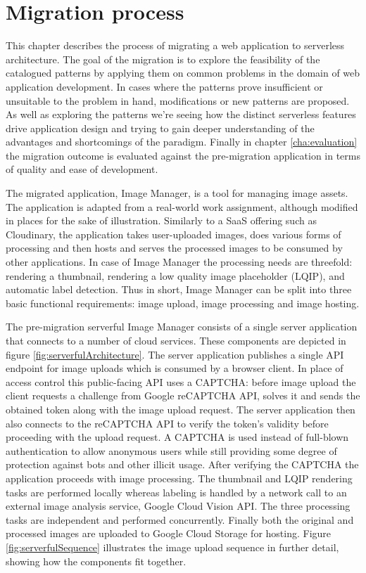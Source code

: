 \chapter{Migration process}

This chapter describes the process of migrating a web application to serverless architecture. The goal of the migration is to explore the feasibility of the catalogued patterns by applying them on common problems in the domain of web application development. In cases where the patterns prove insufficient or unsuitable to the problem in hand, modifications or new patterns are proposed. As well as exploring the patterns we're seeing how the distinct serverless features drive application design and trying to gain deeper understanding of the advantages and shortcomings of the paradigm. Finally in chapter \ref{cha:evaluation} the migration outcome is evaluated against the pre-migration application in terms of quality and ease of development.

The migrated application, Image Manager, is a tool for managing image assets. The application is adapted from a real-world work assignment, although modified in places for the sake of illustration. Similarly to a SaaS offering such as Cloudinary, the application takes user-uploaded images, does various forms of processing and then hosts and serves the processed images to be consumed by other applications. In case of Image Manager the processing needs are threefold: rendering a thumbnail, rendering a low quality image placeholder (LQIP), and automatic label detection. Thus in short, Image Manager can be split into three basic functional requirements: image upload, image processing and image hosting.

The pre-migration serverful Image Manager consists of a single server application that connects to a number of cloud services. These components are depicted in figure \ref{fig:serverfulArchitecture}. The server application publishes a single API endpoint for image uploads which is consumed by a browser client. In place of access control this public-facing API uses a CAPTCHA: before image upload the client requests a challenge from Google reCAPTCHA API, solves it and sends the obtained token along with the image upload request. The server application then also connects to the reCAPTCHA API to verify the token's validity before proceeding with the upload request. A CAPTCHA is used instead of full-blown authentication to allow anonymous users while still providing some degree of protection against bots and other illicit usage. After verifying the CAPTCHA the application proceeds with image processing. The thumbnail and LQIP rendering tasks are performed locally whereas labeling is handled by a network call to an external image analysis service, Google Cloud Vision API. The three processing tasks are independent and performed concurrently. Finally both the original and processed images are uploaded to Google Cloud Storage for hosting. Figure \ref{fig:serverfulSequence} illustrates the image upload sequence in further detail, showing how the components fit together.

